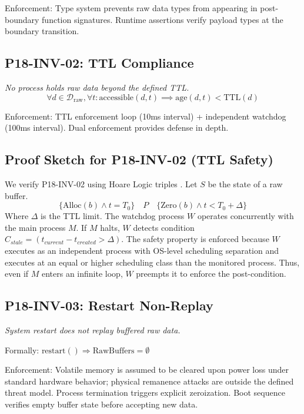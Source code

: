 \documentclass[conference]{IEEEtran}
\begin{document}
Enforcement: Type system prevents raw data types from appearing in post-boundary function signatures. Runtime assertions verify payload types at the boundary transition.

\subsection{P18-INV-02: TTL Compliance}
\textit{No process holds raw data beyond the defined TTL.}
\begin{equation}
\forall d \in \mathcal{D}_{\mathrm{raw}}, \forall t: \mathrm{accessible}(d, t) \implies \mathrm{age}(d, t) < \mathrm{TTL}(d)
\end{equation}

Enforcement: TTL enforcement loop (10ms interval) + independent watchdog (100ms interval). Dual enforcement provides defense in depth.

\subsection{Proof Sketch for P18-INV-02 (TTL Safety)}
We verify P18-INV-02 using Hoare Logic triples \cite{b19}. Let $S$ be the state of a raw buffer.
\begin{equation}
\{ \text{Alloc}(b) \land t = T_0 \} \quad P \quad \{ \text{Zero}(b) \land t < T_0 + \Delta \}
\end{equation}
Where $\Delta$ is the TTL limit.
The watchdog process $W$ operates concurrently with the main process $M$.
If $M$ halts, $W$ detects condition $C_{stale} = (t_{current} - t_{created} > \Delta)$.
The safety property is enforced because $W$ executes as an independent process with OS-level scheduling separation and executes at an equal or higher scheduling class than the monitored process. Thus, even if $M$ enters an infinite loop, $W$ preempts it to enforce the post-condition.

\subsection{P18-INV-03: Restart Non-Replay}
\textit{System restart does not replay buffered raw data.}

Formally: $\text{restart}() \Rightarrow \text{RawBuffers} = \emptyset$

Enforcement: Volatile memory is assumed to be cleared upon power loss under standard hardware behavior; physical remanence attacks are outside the defined threat model. Process termination triggers explicit zeroization. Boot sequence verifies empty buffer state before accepting new data.
\end{document}
